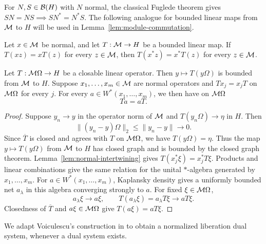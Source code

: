For \(N,S\in\mathcal B(H)\) with \(N\) normal, the classical Fuglede theorem \cite[Theorem~I, p.~35]{Fug50} gives \(SN=NS\implies SN^*=N^*S\).
The following analogue for bounded linear maps from \(\mathcal M\) to \(H\) will be used in Lemma~\ref{lem:module-commutation}.

\begin{lemma}\label{lem:normal-intertwining}
Let \(x\in\mathcal M\) be normal, and let \(T:\mathcal M\to H\) be a bounded linear map.
If \(T(xz)=xT(z)\) for every \(z\in\mathcal M\), then \(T(x^*z)=x^*T(z)\) for every \(z\in\mathcal M\).
\end{lemma}

\begin{lemma}\label{lem:module-commutation}
Let \(T:\mathcal M\Omega\to H\) be a closable linear operator.
Then \(y\mapsto T(y\Omega)\) is bounded from \(\mathcal M\) to \(H\).
Suppose \(x_1,\ldots,x_m\in\mathcal M\) are normal operators and \(Tx_j=x_jT\) on \(\mathcal M\Omega\) for every \(j\).
For every \(a\in W^*(x_1,\ldots,x_m)\), we then have on \(\mathcal M\Omega\)
\[
 Ta=aT.
\]
\end{lemma}
\begin{proof}
Suppose \(y_n\to y\) in the operator norm of \(\mathcal M\) and \(T(y_n\Omega)\to\eta\) in \(H\).
Then
\[
 \|(y_n-y)\Omega\|_2\leq\|y_n-y\|\longrightarrow 0.
\]
Since \(\overline T\) is closed and agrees with \(T\) on \(\mathcal M\Omega\), we have \(T(y\Omega)=\eta\).
Thus the map \(y\mapsto T(y\Omega)\) from \(\mathcal M\) to \(H\) has closed graph and is bounded by the closed graph theorem.
Lemma~\ref{lem:normal-intertwining} gives \(T(x_j^*\xi)=x_j^*T\xi\).
Products and linear combinations give the same relation for the unital $*$-algebra generated by \(x_1,\ldots,x_m\).
For \(a\in W^*(x_1,\ldots,x_m)\), Kaplansky density \cite[Theorem~2.3.1]{AP18} gives a uniformly bounded net \(a_\lambda\) in this algebra converging strongly to \(a\).
For fixed \(\xi\in\mathcal M\Omega\),
\[
 a_\lambda\xi\longrightarrow a\xi,\qquad
 T(a_\lambda\xi)=a_\lambda T\xi\longrightarrow aT\xi.
\]
Closedness of \(\overline T\) and \(a\xi\in\mathcal M\Omega\) give \(T(a\xi)=aT\xi\).
\end{proof}


We adapt Voiculescu's construction in \cite[Remark~13.2(c)]{Voi99} to obtain a normalized liberation dual system, whenever a dual system exists.

